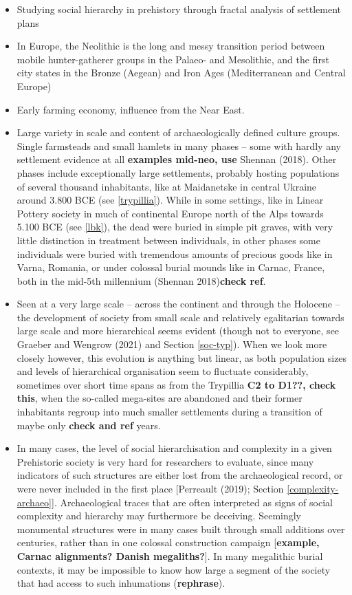 \documentclass[
  12pt,
]{book}
\begin{document}
\begin{itemize}
\item
  Studying social hierarchy in prehistory through fractal analysis of settlement plans
\item
  In Europe, the Neolithic is the long and messy transition period between mobile hunter-gatherer groups in the Palaeo- and Mesolithic, and the first city states in the Bronze (Aegean) and Iron Ages (Mediterranean and Central Europe)
\item
  Early farming economy, influence from the Near East.
\item
  Large variety in scale and content of archaeologically defined culture groups. Single farmsteads and small hamlets in many phases -- some with hardly any settlement evidence at all \textbf{examples mid-neo, use} Shennan (2018). Other phases include exceptionally large settlements, probably hosting populations of several thousand inhabitants, like at Maidanetske in central Ukraine around 3.800 BCE (see \ref{trypillia}). While in some settings, like in Linear Pottery society in much of continental Europe north of the Alps towards 5.100 BCE (see \ref{lbk}), the dead were buried in simple pit graves, with very little distinction in treatment between individuals, in other phases some individuals were buried with tremendous amounts of precious goods like in Varna, Romania, or under colossal burial mounds like in Carnac, France, both in the mid-5th millennium (Shennan 2018)\textbf{check ref}.
\item
  Seen at a very large scale -- across the continent and through the Holocene -- the development of society from small scale and relatively egalitarian towards large scale and more hierarchical seems evident (though not to everyone, see Graeber and Wengrow (2021) and Section \ref{soc-typ}). When we look more closely however, this evolution is anything but linear, as both population sizes and levels of hierarchical organisation seem to fluctuate considerably, sometimes over short time spans as from the Trypillia \textbf{C2 to D1??, check this}, when the so-called mega-sites are abandoned and their former inhabitants regroup into much smaller settlements during a transition of maybe only \textbf{check and ref} years.
\item
  In many cases, the level of social hierarchisation and complexity in a given Prehistoric society is very hard for researchers to evaluate, since many indicators of such structures are either lost from the archaeological record, or were never included in the first place {[}Perreault (2019); Section \ref{complexity-archaeo}{]}. Archaeological traces that are often interpreted as signs of social complexity and hierarchy may furthermore be deceiving. Seemingly monumental structures were in many cases built through small additions over centuries, rather than in one colossal construction campaign {[}\textbf{example, Carnac alignments? Danish megaliths?}{]}. In many megalithic burial contexts, it may be impossible to know how large a segment of the society that had access to such inhumations (\textbf{rephrase}).

\end{itemize}
\end{document}
